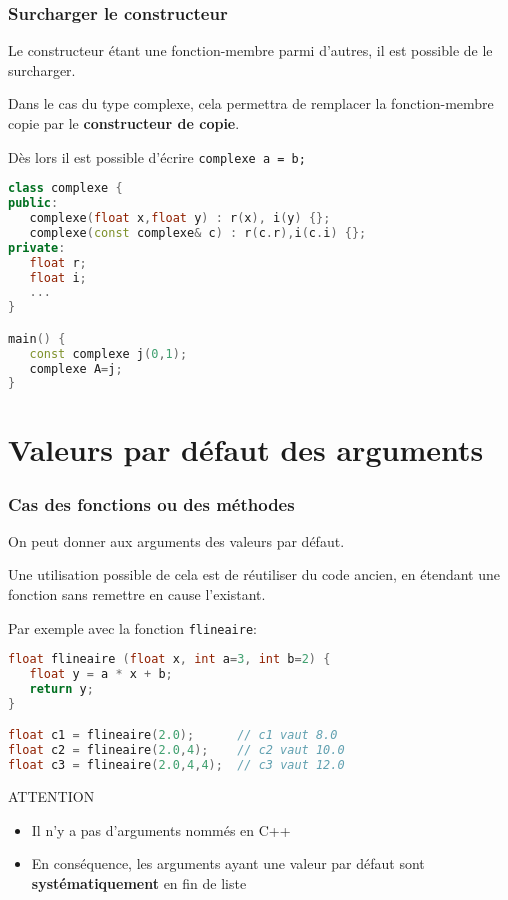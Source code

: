 \documentclass{beamer}
\begin{document}
\begin{frame}[fragile=singleslide,shrink=20]
\frametitle {Surcharger le constructeur}

Le constructeur étant une fonction-membre parmi d'autres, il est possible de le surcharger. 

Dans le cas du type complexe, cela permettra
de remplacer la fonction-membre copie par le \textbf{constructeur de copie}.

Dès lors il est possible d'écrire \texttt{complexe a = b;}

\begin{lstlisting}[language=c++]
class complexe {
public:
   complexe(float x,float y) : r(x), i(y) {};
   complexe(const complexe& c) : r(c.r),i(c.i) {};
private:
   float r;
   float i;
   ...
}

main() {
   const complexe j(0,1);
   complexe A=j;
}
\end{lstlisting}
\end{frame}

\section{Valeurs par défaut des arguments}

\begin{frame}[fragile=singleslide,shrink=20]
\frametitle {Cas des fonctions ou des méthodes}
On peut donner aux arguments des valeurs par défaut.

Une utilisation possible de cela est de réutiliser du code ancien, en étendant une fonction sans remettre en cause l'existant.

Par exemple avec la fonction \texttt{flineaire}:

\begin{lstlisting}[language=c++]
float flineaire (float x, int a=3, int b=2) {                   
   float y = a * x + b;
   return y;
}

float c1 = flineaire(2.0);      // c1 vaut 8.0
float c2 = flineaire(2.0,4);    // c2 vaut 10.0
float c3 = flineaire(2.0,4,4);  // c3 vaut 12.0
\end{lstlisting}

\begin{block}{ATTENTION}
\begin{itemize}
\item{Il n'y a pas d'arguments nommés en C++}
\item{En conséquence, les arguments ayant une valeur par défaut sont \textbf{systématiquement} en fin de liste}
\end{itemize}
\end{block}
\end{frame}
\end{document}
